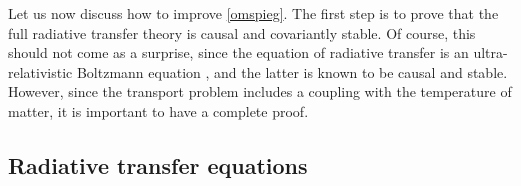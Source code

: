 \documentclass[a4paper, amsfonts, amssymb, amsmath, reprint, showkeys, nofootinbib, twoside,notitlepage,onecolumn]{revtex4-2}
\theoremstyle{definition}
\theoremstyle{theorem}
\theoremstyle{corollary}
\begin{document}
Let us now discuss how to improve \eqref{omspieg}. The first step is to prove that the full radiative transfer theory is causal and covariantly stable. Of course, this should not come as a surprise, since the equation of radiative transfer is an ultra-relativistic Boltzmann equation \cite{Groot1980RelativisticKT,cercignani_book}, and the latter is known to be causal and stable. However, since the transport problem includes a coupling with the temperature of matter, it is important to have a complete proof.

\vspace{-0.2cm}
\subsection{Radiative transfer equations}
\vspace{-0.2cm}
\end{document}
